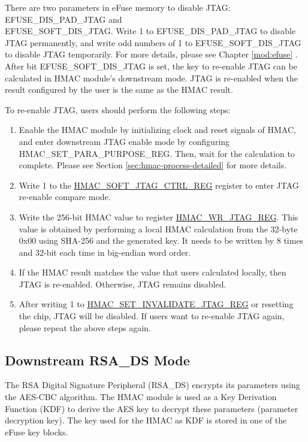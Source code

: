 \documentclass[main\_\_EN.tex]{subfiles}
\begin{document}
There are two parameters in eFuse memory to disable JTAG: EFUSE\_DIS\_PAD\_JTAG and \\EFUSE\_SOFT\_DIS\_JTAG. Write 1 to EFUSE\_DIS\_PAD\_JTAG to disable JTAG permanently, and write odd numbers of 1 to EFUSE\_SOFT\_DIS\_JTAG to disable JTAG temporarily. For more details, please see Chapter \ref{mod:efuse} \textit{}. After bit EFUSE\_SOFT\_DIS\_JTAG is set, the key to re-enable JTAG can be calculated in HMAC module's downstream mode. JTAG is re-enabled when the result configured by the user is the same as the HMAC result.

To re-enable JTAG, users should perform the following steps:

\begin{enumerate}
\item Enable the HMAC module by initializing clock and reset signals of HMAC, and enter downstream JTAG enable mode by configuring HMAC\_SET\_PARA\_PURPOSE\_REG. Then, wait for the calculation to complete. Please see Section \ref{sec:hmac-process-detailed} for more details.
\item Write 1 to the \hyperref[regdesc:HMACSOFTJTAGCTRLREG]{HMAC\_SOFT\_JTAG\_CTRL\_REG} register to enter JTAG re-enable compare mode.
\item Write the 256-bit HMAC value to register \hyperref[regdesc:HMACWRJTAGREG]{HMAC\_WR\_JTAG\_REG}. This value is obtained by performing a local HMAC calculation from the 32-byte 0x00 using SHA-256 and the generated key. It needs to be written by 8 times and 32-bit each time in big-endian word order.
\item If the HMAC result matches the value that users calculated locally, then JTAG is re-enabled. Otherwise, JTAG remains disabled.
\item After writing 1 to \hyperref[regdesc:HMACSETINVALIDATEJTAGREG]{HMAC\_SET\_INVALIDATE\_JTAG\_REG} or resetting the chip, JTAG will be disabled. If users want to re-enable JTAG again, please repeat the above steps again.
\end{enumerate}

\subsection{Downstream RSA\_DS Mode}

The RSA Digital Signature Peripheral (RSA\_DS) encrypts its parameters using the AES-CBC algorithm. The HMAC module is used as a Key Derivation Function (KDF) to derive the AES key to decrypt these parameters (parameter decryption key). The key used for the HMAC as KDF is stored in one of the eFuse key blocks.
\end{document}
